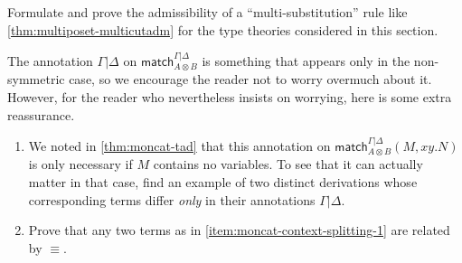 \documentclass{book}
\let\types\vdash
\def\match{\mathsf{match}}
\def\one{\mathbf{1}}
\let\tensor\otimes
\def\tpair#1#2{\text{\textlquill} #1,#2 \text{\textrquill}}%
\begin{document}
\begin{ex}\label{ex:moncat-multisubadm}
  Formulate and prove the admissibility of a ``multi-substitution'' rule like \cref{thm:multiposet-multicutadm} for the type theories considered in this section.
\end{ex}

\begin{ex}\label{ex:moncat-context-splitting}
  The annotation $\Gamma|\Delta$ on $\match_{A\tensor B}^{\Gamma|\Delta}$ is something that appears only in the non-symmetric case, so we encourage the reader not to worry overmuch about it.
  However, for the reader who nevertheless insists on worrying, here is some extra reassurance.
  \begin{enumerate}
  \item We noted in \cref{thm:moncat-tad} that this annotation on $\match_{A\tensor B}^{\Gamma|\Delta}(M,xy.N)$ is only necessary if $M$ contains no variables.
    To see that it can actually matter in that case, find an example of two distinct derivations whose corresponding terms differ \emph{only} in their annotations $\Gamma|\Delta$.\label{item:moncat-context-splitting-1}
  \item Prove that any two terms as in \ref{item:moncat-context-splitting-1} are related by $\equiv$.
  \end{enumerate}
\end{ex}
\end{document}
